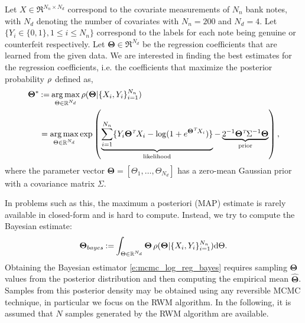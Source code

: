 Let $X \in \Re^{N_n \times N_d}$ correspond to the covariate measurements of $N_n$ bank notes, with $N_d$ denoting the number of covariates with $N_n = 200$ and $N_d = 4$. Let $\{Y_i  \in \{0,1\}, 1 \leq i \leq N_n \}$ correspond to the labels for each note being genuine or counterfeit respectively. Let $\boldsymbol{\Theta} \in \Re^{N_d}$ be the regression coefficients that are learned from the given data. We are interested in finding the best estimates for the regression coefficients, i.e. the coefficients that maximize the posterior probability $\rho$ defined as,
\begin{equation}
\begin{aligned}
\boldsymbol{\Theta}^* &\eqdef  \argmax_{\Theta \in \Re^{N_d}} \pr(\boldsymbol{\Theta}| \{X_i,Y_i\}_{i=1}^{N_n}) \\
&= \argmax_{\Theta \in \Re^{N_d} }\exp\left( \underbrace{\sum_{i=1}^{N_n} \{Y_i \boldsymbol{\Theta}^\transpose X_i - \log(1+e^{\boldsymbol{\Theta}^\transpose X_i} ) \}}_{\text{likelihood}} - \underbrace{2^{-1} \boldsymbol{\Theta}^\transpose \Sigma^{-1} \boldsymbol{\Theta}}_{\text{prior}} \right),
\end{aligned}
\label{e:mcmc_log_reg}
\end{equation}
where the parameter vector $\boldsymbol{\Theta} = [ \Theta_1, \dots ,\Theta_{N_d}]$ has a zero-mean Gaussian prior with a covariance matrix $\Sigma$.

In problems such as this, the maximum a posteriori (MAP) estimate is rarely available in closed-form and is hard to compute. Instead, we try to compute the Bayesian estimate: 
\begin{equation}
\boldsymbol{\Theta}_{{bayes}} \eqdef \int_{\Theta \in \Re^{N_d}} \boldsymbol{\Theta} \, \pr(\boldsymbol{\Theta}| \{X_i,Y_i\}_{i=1}^{N_n}) \ud \Theta.
\label{e:mcmc_log_reg_bayes}
\end{equation}
Obtaining the Bayesian estimator \eqref{e:mcmc_log_reg_bayes} requires sampling $\boldsymbol{\Theta}$ values from the posterior distribution and then computing the empirical mean $\hat{\boldsymbol{\Theta}}$. Samples from this posterior density may be obtained using any reversible MCMC technique, in particular we focus on the RWM algorithm. In the following, it is assumed that $N$ samples generated by the RWM algorithm are available.

